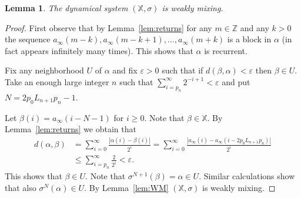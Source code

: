 \documentclass[reqno,a4paper,12pt]{amsart}
\newtheorem{lem}[thm]{Lemma}
\theoremstyle{definition}
\numberwithin{equation}{section}
\begin{document}
\begin{lem}\label{alpha:wm}
The dynamical system $(\mathbb{X},\sigma)$ is weakly mixing.
\end{lem}
\begin{proof}
First observe that by Lemma~\ref{lem:returns} for any $m\in {\mathbb{Z}}$ and
any $k>0$ the sequence $a_{\infty}(m-k),a_{\infty}(m-k+1),\ldots, a_{\infty}(m+k)$
is a block in $\alpha$ (in fact appears infinitely many times). This shows that $\alpha$ is recurrent.

Fix any neighborhood $U$ of $\alpha$ and fix ${\varepsilon}>0$ such that if $d(\beta,\alpha)<{\varepsilon}$ then $\beta\in U$.
Take an enough large integer $n$ such that $\sum_{i=p_n}^\infty 2^{-i+1}<{\varepsilon}$ and put $N=2p_0 L_{n+1}p_n-1$.

Let $\beta(i)=a_{\infty}(i-N-1)$ for $i\geq 0$. Note that $\beta\in \mathbb{X}$.
By Lemma~\ref{lem:returns} we obtain that
\begin{align*}
d(\alpha,\beta)&=\sum_{i=0}^{\infty}\frac{|\alpha(i)-\beta(i)|}{2^i} = \sum_{i=0}^{\infty}\frac{|a_\infty(i)-a_\infty(i-2p_0L_{n+1}p_n)|}{2^i}\\
&\leq\sum_{i=p_{n}}^{\infty}\frac{2}{2^i}<{\varepsilon}.
\end{align*}
This shows that $\beta\in U$. Note that $\sigma^{N+1}(\beta)=\alpha\in U$.
Similar calculations show that also $\sigma^{N}(\alpha)\in U$.
By Lemma~\ref{lem:WM} $(\mathbb{X},\sigma)$ is weakly mixing.
\end{proof}
\end{document}
